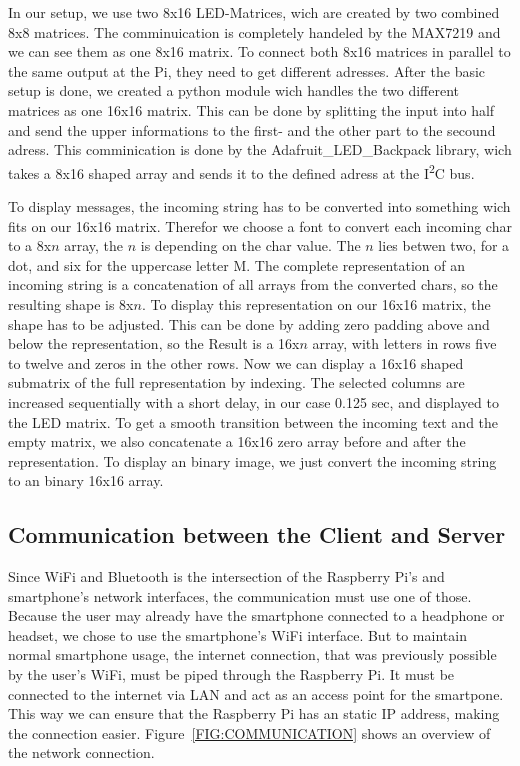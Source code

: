 \documentclass[conference]{IEEEtran}
\begin{document}
In our setup, we use two 8x16 LED-Matrices, wich are created by two combined 8x8 matrices. The comminuication is completely handeled by the MAX7219 and we can see them as one 8x16 matrix. To connect both 8x16 matrices in parallel to the same output at the Pi, they need to get different adresses.
After the basic setup is done, we created a python module wich handles the two different matrices as one 16x16 matrix. This can be done by splitting the input into half and send the upper informations to the first- and the other part to the secound adress. This comminication is done by the Adafruit\_LED\_Backpack\cite{ledlibrary} library, wich takes a 8x16 shaped array and sends it to the defined adress at the I\textsuperscript{2}C bus.

To display messages, the incoming string has to be converted into something wich fits on our 16x16 matrix. Therefor we choose a font to convert each incoming char to a 8x$n$ array, the $n$ is depending on the char value. The $n$ lies betwen two, for a dot, and six for the uppercase letter M. The complete representation of an incoming string is a concatenation of all arrays from the converted chars, so the resulting shape is 8x$n$. To display this representation on our 16x16 matrix, the shape has to be adjusted. This can be done by adding zero padding above and below the representation, so the Result is a 16x$n$ array, with letters in rows five to twelve and zeros in the other rows. Now we can display a 16x16 shaped submatrix of the full representation by indexing. The selected columns are increased sequentially with a short delay, in our case 0.125 sec, and displayed to the LED matrix. To get a smooth transition between the incoming text and the empty matrix, we also concatenate a 16x16 zero array before and after the representation. To display an binary image, we just convert the incoming string to an binary 16x16 array.

\subsection{Communication between the Client and Server}\label{SEC:COMMUNICATIONCLIENTSERVER}
Since WiFi and Bluetooth is the intersection of the Raspberry Pi's and smartphone's network interfaces, the communication must use one of those. Because the user may already have the smartphone connected to a headphone or headset, we chose to use the smartphone's WiFi interface. But to maintain normal smartphone usage, the internet connection, that was previously possible by the user's WiFi, must be piped through the Raspberry Pi. It must be connected to the internet via LAN and act as an access point for the smartpone. This way we can ensure that the Raspberry Pi has an static IP address, making the connection easier. Figure~\ref{FIG:COMMUNICATION} shows an overview of the network connection.
\end{document}
